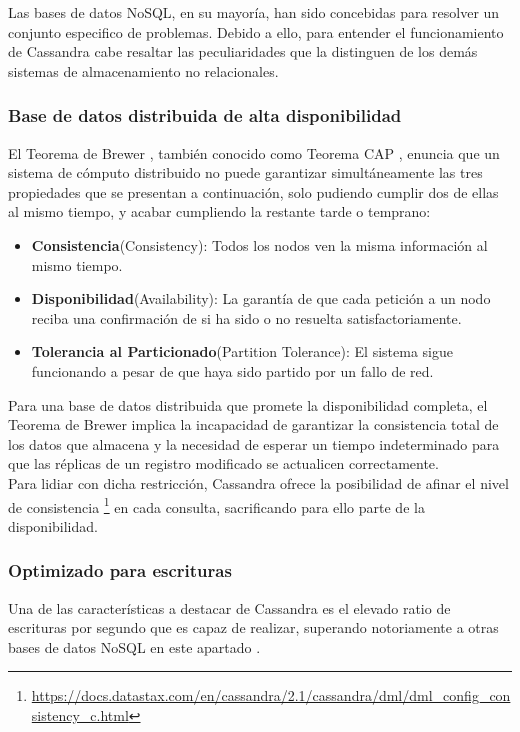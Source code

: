 Las bases de datos NoSQL, en su mayoría, han sido concebidas para resolver un conjunto especifico de problemas. Debido a ello, para entender el funcionamiento de Cassandra cabe resaltar las peculiaridades que la distinguen de los demás sistemas de almacenamiento no relacionales.

\subsubsection{Base de datos distribuida de alta disponibilidad}

El Teorema de Brewer \cite{gilbert2002brewer}, también conocido como Teorema CAP , enuncia que un sistema de cómputo distribuido no puede  garantizar simultáneamente las tres propiedades que se presentan a continuación, solo pudiendo cumplir dos de ellas al mismo tiempo, y acabar cumpliendo la restante tarde o temprano:

\begin{itemize}
	\item \textbf{Consistencia}(Consistency): Todos los nodos ven la misma información al mismo tiempo.
	\item \textbf{Disponibilidad}(Availability): La garantía de que cada petición a un nodo reciba una confirmación de si ha sido o no resuelta satisfactoriamente.
	\item \textbf{Tolerancia al Particionado}(Partition Tolerance): El sistema sigue funcionando a pesar de que haya sido partido por un fallo de red.
\end{itemize}

Para una base de datos distribuida que promete la disponibilidad completa, el Teorema de Brewer implica la incapacidad de garantizar la consistencia total de los datos que almacena y la necesidad de esperar un tiempo indeterminado para que las réplicas de un registro modificado se actualicen correctamente.\\

Para lidiar con dicha restricción, Cassandra ofrece la posibilidad de afinar el nivel de consistencia \footnote{\url{https://docs.datastax.com/en/cassandra/2.1/cassandra/dml/dml_config_consistency_c.html}} en cada consulta, sacrificando para ello parte de la disponibilidad.

\subsubsection{Optimizado para escrituras}

Una de las características a destacar de Cassandra es el elevado ratio de escrituras por segundo que es capaz de realizar, superando notoriamente a otras bases de datos NoSQL en este apartado \cite{rabl2012solving}.\\

